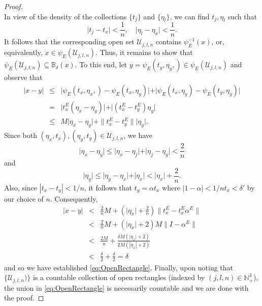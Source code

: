 \documentclass[11pt]{article}
\begin{document}
\begin{proof}
\begin{equation*}
\end{equation*}
In view of the density of the collections $\{t_j\}$ and $\{\eta_l\}$, we can find $t_j, \eta_l$ such that
\begin{equation*}
    \vert t_j - t_x \vert < \frac{1}{n},\quad \vert \eta_l - \eta_x \vert < \frac{1}{n}.
\end{equation*}
It follows that the corresponding open set $\mathcal{U}_{j,l,n}$ contains $\psi_E^{-1}(x)$, or, equivalently, $x\in \psi_E(\mathcal{U}_{j,l,n})$. Thus, it remains to show that $\psi_E(\mathcal{U}_{j,l,n}) \subseteq \mathbb{B}_\delta(x)$. To this end, let $y=\psi_E(t_y,\eta_y,)\in\psi_E(\mathcal{U}_{j,l,n})$ and observe that
\begin{eqnarray*}
| x - y | &\leq& \vert \psi_E(t_x,\eta_x,) - \psi_E(t_x,\eta_y) \vert 
    + \vert \psi_E(t_x,\eta_y) - \psi_E(t_y,\eta_y) \vert\\
    &=&  \vert t_x^E (\eta_x - \eta_y) \vert + \vert (t_x^E - t_y^E) \eta_y \vert\\
    &\leq& M\vert \eta_x - \eta_y \vert + \|{t_x^E - t_y^E}\|  \vert \eta_y \vert.
\end{eqnarray*}
Since both $(\eta_x,t_x),(\eta_y,t_y) \in \mathcal{U}_{j,l,n}$, we have
\begin{equation*}
    \vert \eta_x - \eta_y \vert \leq \vert \eta_x - \eta_j \vert + \vert \eta_j - \eta_y \vert < \frac{2}{n}
\end{equation*}
and
\begin{equation*}
    \vert \eta_y \vert \leq \vert \eta_y - \eta_x \vert + \vert \eta_x \vert < \vert \eta_x \vert + \frac{2}{n}.
\end{equation*}
Also, since $|t_x-t_y|<1/n$, it follows that $t_y=\alpha t_x$ where $|1-\alpha|<1/nt_x < \delta'$ by our choice of $n$. Consequently,
\begin{eqnarray*}
    \vert x - y \vert 
    &< & \frac{2}{n} M+ \left( \vert \eta_x \vert + \frac{2}{n} \right) \|{t_x^E -   t_x^E \alpha^E}\|   \\ 
    &<& \frac{2}{n}M + \left( \vert \eta_x \vert + 2 \right)M\| I - \alpha^E\| \\
    &<&  \frac{2M }{n} +  \frac{\delta M \left( \vert \eta_x \vert + 2\right) }{2M (| \eta_x | + 2)}  \\
    &<& \frac{\delta}{2} + \frac{\delta}{2}=\delta 
\end{eqnarray*}
and so we have established \eqref{eq:OpenRectangle}. Finally, upon noting that $\{\mathcal{U}_{j,l,n})\}$ is a countable collection of open rectangles (indexed by $(j,l,n)\in\mathbb{N}_+^3$), the union in \eqref{eq:OpenRectangle} is necessarily countable and we are done with the proof.
\end{proof}
\end{document}
